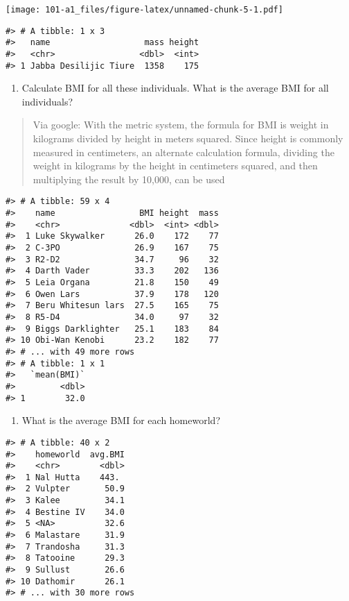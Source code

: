 \documentclass[
]{book}
\providecommand{\tightlist}{%
  \setlength{\itemsep}{0pt}\setlength{\parskip}{0pt}}
\theoremstyle{definition}
\theoremstyle{definition}
\theoremstyle{definition}
\theoremstyle{definition}
\theoremstyle{remark}
\begin{document}
\texttt{[image: 101-a1\_files/figure-latex/unnamed-chunk-5-1.pdf]}

\begin{verbatim}
#> # A tibble: 1 x 3
#>   name                   mass height
#>   <chr>                 <dbl>  <int>
#> 1 Jabba Desilijic Tiure  1358    175
\end{verbatim}

\begin{enumerate}
\def\labelenumi{\arabic{enumi}.}
\setcounter{enumi}{6}
\tightlist
\item
  Calculate BMI for all these individuals. What is the average BMI for all individuals?
\end{enumerate}

\begin{quote}
Via google: With the metric system, the formula for BMI is weight in kilograms divided by height in meters squared. Since height is commonly measured in centimeters, an alternate calculation formula, dividing the weight in kilograms by the height in centimeters squared, and then multiplying the result by 10,000, can be used
\end{quote}

\begin{verbatim}
#> # A tibble: 59 x 4
#>    name                 BMI height  mass
#>    <chr>              <dbl>  <int> <dbl>
#>  1 Luke Skywalker      26.0    172    77
#>  2 C-3PO               26.9    167    75
#>  3 R2-D2               34.7     96    32
#>  4 Darth Vader         33.3    202   136
#>  5 Leia Organa         21.8    150    49
#>  6 Owen Lars           37.9    178   120
#>  7 Beru Whitesun lars  27.5    165    75
#>  8 R5-D4               34.0     97    32
#>  9 Biggs Darklighter   25.1    183    84
#> 10 Obi-Wan Kenobi      23.2    182    77
#> # ... with 49 more rows
#> # A tibble: 1 x 1
#>   `mean(BMI)`
#>         <dbl>
#> 1        32.0
\end{verbatim}

\begin{enumerate}
\def\labelenumi{\arabic{enumi}.}
\setcounter{enumi}{7}
\tightlist
\item
  What is the average BMI for each homeworld?
\end{enumerate}

\begin{verbatim}
#> # A tibble: 40 x 2
#>    homeworld  avg.BMI
#>    <chr>        <dbl>
#>  1 Nal Hutta    443. 
#>  2 Vulpter       50.9
#>  3 Kalee         34.1
#>  4 Bestine IV    34.0
#>  5 <NA>          32.6
#>  6 Malastare     31.9
#>  7 Trandosha     31.3
#>  8 Tatooine      29.3
#>  9 Sullust       26.6
#> 10 Dathomir      26.1
#> # ... with 30 more rows
\end{verbatim}
\end{document}
